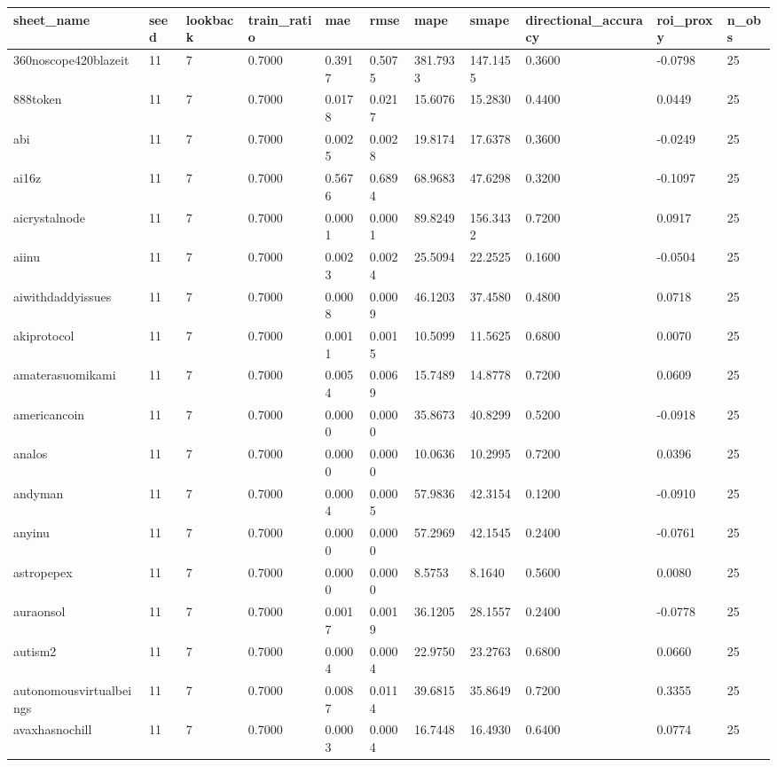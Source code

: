\begin{table}[htbp]
\centering
\begin{tabular}{lllllllllll}
\hline
sheet_name & seed & lookback & train_ratio & mae & rmse & mape & smape & directional_accuracy & roi_proxy & n_obs \\
\hline
360noscope420blazeit & 11 & 7 & 0.7000 & 0.3917 & 0.5075 & 381.7933 & 147.1455 & 0.3600 & -0.0798 & 25 \\
888token & 11 & 7 & 0.7000 & 0.0178 & 0.0217 & 15.6076 & 15.2830 & 0.4400 & 0.0449 & 25 \\
abi & 11 & 7 & 0.7000 & 0.0025 & 0.0028 & 19.8174 & 17.6378 & 0.3600 & -0.0249 & 25 \\
ai16z & 11 & 7 & 0.7000 & 0.5676 & 0.6894 & 68.9683 & 47.6298 & 0.3200 & -0.1097 & 25 \\
aicrystalnode & 11 & 7 & 0.7000 & 0.0001 & 0.0001 & 89.8249 & 156.3432 & 0.7200 & 0.0917 & 25 \\
aiinu & 11 & 7 & 0.7000 & 0.0023 & 0.0024 & 25.5094 & 22.2525 & 0.1600 & -0.0504 & 25 \\
aiwithdaddyissues & 11 & 7 & 0.7000 & 0.0008 & 0.0009 & 46.1203 & 37.4580 & 0.4800 & 0.0718 & 25 \\
akiprotocol & 11 & 7 & 0.7000 & 0.0011 & 0.0015 & 10.5099 & 11.5625 & 0.6800 & 0.0070 & 25 \\
amaterasuomikami & 11 & 7 & 0.7000 & 0.0054 & 0.0069 & 15.7489 & 14.8778 & 0.7200 & 0.0609 & 25 \\
americancoin & 11 & 7 & 0.7000 & 0.0000 & 0.0000 & 35.8673 & 40.8299 & 0.5200 & -0.0918 & 25 \\
analos & 11 & 7 & 0.7000 & 0.0000 & 0.0000 & 10.0636 & 10.2995 & 0.7200 & 0.0396 & 25 \\
andyman & 11 & 7 & 0.7000 & 0.0004 & 0.0005 & 57.9836 & 42.3154 & 0.1200 & -0.0910 & 25 \\
anyinu & 11 & 7 & 0.7000 & 0.0000 & 0.0000 & 57.2969 & 42.1545 & 0.2400 & -0.0761 & 25 \\
astropepex & 11 & 7 & 0.7000 & 0.0000 & 0.0000 & 8.5753 & 8.1640 & 0.5600 & 0.0080 & 25 \\
auraonsol & 11 & 7 & 0.7000 & 0.0017 & 0.0019 & 36.1205 & 28.1557 & 0.2400 & -0.0778 & 25 \\
autism2 & 11 & 7 & 0.7000 & 0.0004 & 0.0004 & 22.9750 & 23.2763 & 0.6800 & 0.0660 & 25 \\
autonomousvirtualbeings & 11 & 7 & 0.7000 & 0.0087 & 0.0114 & 39.6815 & 35.8649 & 0.7200 & 0.3355 & 25 \\
avaxhasnochill & 11 & 7 & 0.7000 & 0.0003 & 0.0004 & 16.7448 & 16.4930 & 0.6400 & 0.0774 & 25 \\

\end{tabular}
\end{table}
